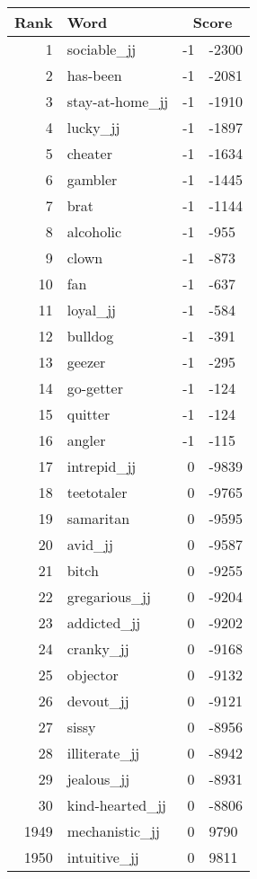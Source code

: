 \begin{longtable}[!htbp]{| rlr@{.}l |}
    \hline
    \textbf{Rank} & \textbf{Word} & \multicolumn{2}{c|}{\textbf{Score}} \\
    \hline
    \endhead
    1 & sociable\_jj & -1 & -2300 \\
    2 & has-been & -1 & -2081 \\
    3 & stay-at-home\_jj & -1 & -1910 \\
    4 & lucky\_jj & -1 & -1897 \\
    5 & cheater & -1 & -1634 \\
    6 & gambler & -1 & -1445 \\
    7 & brat & -1 & -1144 \\
    8 & alcoholic & -1 & -955 \\
    9 & clown & -1 & -873 \\
    10 & fan & -1 & -637 \\
    11 & loyal\_jj & -1 & -584 \\
    12 & bulldog & -1 & -391 \\
    13 & geezer & -1 & -295 \\
    14 & go-getter & -1 & -124 \\
    15 & quitter & -1 & -124 \\
    16 & angler & -1 & -115 \\
    17 & intrepid\_jj & 0 & -9839 \\
    18 & teetotaler & 0 & -9765 \\
    19 & samaritan & 0 & -9595 \\
    20 & avid\_jj & 0 & -9587 \\
    21 & bitch & 0 & -9255 \\
    22 & gregarious\_jj & 0 & -9204 \\
    23 & addicted\_jj & 0 & -9202 \\
    24 & cranky\_jj & 0 & -9168 \\
    25 & objector & 0 & -9132 \\
    26 & devout\_jj & 0 & -9121 \\
    27 & sissy & 0 & -8956 \\
    28 & illiterate\_jj & 0 & -8942 \\
    29 & jealous\_jj & 0 & -8931 \\
    30 & kind-hearted\_jj & 0 & -8806 \\
    1949 & mechanistic\_jj & 0 & 9790 \\
    1950 & intuitive\_jj & 0 & 9811 \\

\end{longtable}
